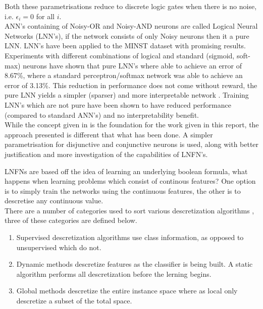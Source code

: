 Both these parametrisations reduce to discrete logic gates when there is no noise, i.e. $\epsilon_i = 0$ for all $i$.\\

ANN's containing of Noisy-OR and Noisy-AND neurons are called Logical Neural Networks (LNN's), if the network consists of only Noisy neurons then it a pure LNN. LNN's have been applied to the MINST dataset with promising results. Experiments with different combinations of logical and standard (sigmoid, soft-max) neurons have shown that pure LNN's where able to achieve an error of 8.67\%, where a standard perceptron/softmax network was able to achieve an error of 3.13\%. This reduction in performance does not come without reward, the pure LNN yields a simpler (sparser) and more interpretable network \cite{LearningLogicalActivations}. Training LNN's which are not pure have been shown to have reduced performance (compared to standard ANN's) and no interpretability benefit.\\

While the concept given in \cite{herrmann1996backpropagation} is the foundation for the work given in this report, the approach presented is different that what has been done. A simpler parametrisation for disjunctive and conjunctive neurons is used, along with better justification and more investigation of the capabilities of LNFN's.


LNFNs are based off the idea of learning an underlying boolean formula, what happens when learning problems which consist of continous features? One option is to simply train the networks using the continuous features, the other is to descretise any continuous value.\\


There are a number of categories used to sort various descretization algorithms \cite{liu2002discretization}, three of these categories are defined below.

\begin{enumerate}
	\item {} Supervised descretization algorithms use class information, as opposed to unsupervised which do not.
	
	\item {} Dynamic methods descretize features as the classifier is being built. A static algorithm performs all descretization before the lerning begins.
	
	\item {} Global methods descretize the entire instance space where as local only descretize a subset of the total space.
\end{enumerate}

